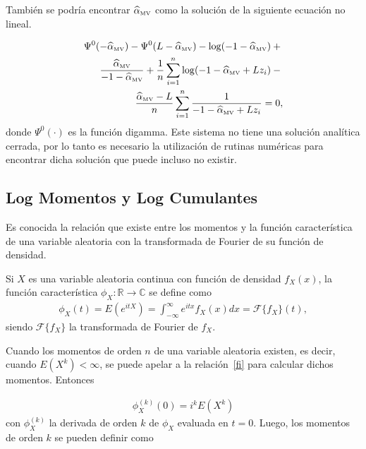 También se podría encontrar $\widehat{\alpha}_{{\text{\tiny{MV}}}}$ como la solución de la siguiente ecuación no lineal.

\begin{align}
\label{rootML}
\Psi^0(-\widehat{\alpha}_{{\text{\tiny{MV}}}})-\Psi^0(L-\widehat{\alpha}_{{\text{\tiny{MV}}}})-\log(-1-\widehat{\alpha}_{{\text{\tiny{MV}}}})+{} \nonumber\\
\frac{\widehat{\alpha}_{{\text{\tiny{MV}}}}}{-1-\widehat{\alpha}_{{\text{\tiny{MV}}}}}+
\frac{1}{n}\sum_{i=1}^n{\log(-1-\widehat{\alpha}_{{\text{\tiny{MV}}}}+Lz_i)}-{}
\nonumber
\\ \frac{\widehat{\alpha}_{{\text{\tiny{MV}}}}-L}{n}\sum_{i=1}^n \frac1{-1-\widehat{\alpha}_{{\text{\tiny{MV}}}}+Lz_i}= 0, 
\end{align}
donde $\Psi^0(\cdot)$ es la función digamma. Este sistema no tiene una solución analítica cerrada, por lo tanto es necesario la utilización de rutinas numéricas para encontrar dicha solución que puede incluso no existir.

\subsection{Log Momentos y Log Cumulantes}

Es conocida la relación que existe entre los momentos y la función característica de una variable aleatoria con la transformada de Fourier de su función de densidad. 

\begin{definition}
Si $X$ es una variable aleatoria continua con función de densidad $f_X(x)$, la función característica $\phi_X: \mathbb{R} \rightarrow \mathbb{C}$ se define como 
\begin{align}
\phi_X(t)=E(e^{itX})=\int_{-\infty}^{\infty} e^{itx} f_X(x) dx = \mathcal{F}\{f_X\}(t),
\label{fi}
\end{align}
siendo $\mathcal{F}\{f_X\}$ la transformada de Fourier de $f_X$.
\end{definition}

Cuando los momentos de orden $n$ de una variable aleatoria existen, es decir, cuando $E(X^k)< \infty$, se puede apelar a la relación~\eqref{fi} para calcular dichos momentos. Entonces

\begin{align}
\phi_X^{(k)}(0)=i^k E(X^k)
\label{fi}
\end{align}
con $\phi_X^{(k)}$ la derivada de orden $k$ de $\phi_X$ evaluada en $t=0$. Luego, los momentos de orden $k$ se pueden definir como 

